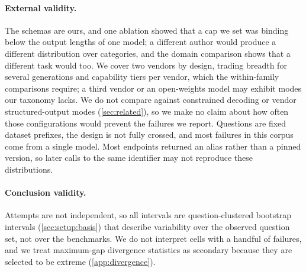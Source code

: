 \paragraph{External validity.}
The schemas are ours, and one ablation showed that a cap we set was
binding below the output lengths of one model; a different author would
produce a different distribution over categories, and the domain
comparison shows that a different task would too. We cover two vendors by
design, trading breadth for several generations and capability tiers per
vendor, which the within-family comparisons require; a third vendor or an
open-weights model may exhibit modes our taxonomy lacks. We do not
compare against constrained decoding or vendor structured-output modes
(\cref{sec:related}), so we make no claim about how often those
configurations would prevent the failures we report. Questions are fixed
dataset prefixes, the design is not fully crossed, and most failures in
this corpus come from a single model. Most endpoints returned an alias
rather than a pinned version, so later calls to the same identifier may
not reproduce these distributions.

\paragraph{Conclusion validity.}
Attempts are not independent, so all intervals are question-clustered
bootstrap intervals (\cref{sec:setup:basis}) that describe variability
over the observed question set, not over the benchmarks. We do not
interpret cells with a handful of failures, and we treat maximum-gap
divergence statistics as secondary because they are selected to be
extreme (\cref{app:divergence}).